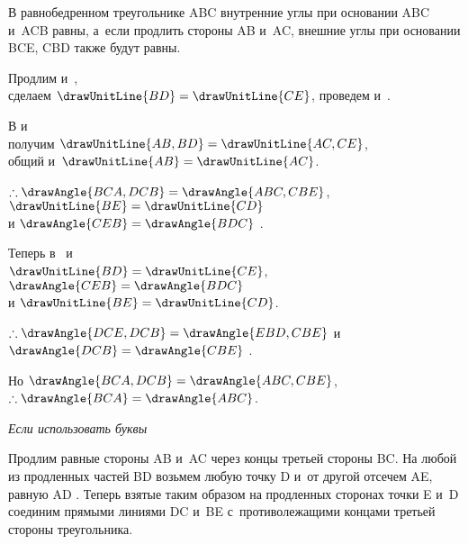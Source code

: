 \documentclass[letters]{byrne-book}
\begin{document}
В равнобедренном треугольнике ABC внутренние углы при основании ABC и~ACB равны, а~если продлить стороны AB и~AC, внешние углы при основании BCE, CBD также будут равны.

\begin{center}
Продлим  и~,\\
сделаем $\drawUnitLine{BD} = \drawUnitLine{CE}$, проведем  и~.

В
и
\\
получим $\drawUnitLine{AB,BD} = \drawUnitLine{AC,CE}$,\\
 общий и~$\drawUnitLine{AB} = \drawUnitLine{AC}$.

$\therefore \drawAngle{BCA,DCB} = \drawAngle{ABC,CBE}$, $\drawUnitLine{BE} = \drawUnitLine{CD}$\\
и $\drawAngle{CEB} = \drawAngle{BDC}$ .

Теперь в~ и~\\
$\drawUnitLine{BD} = \drawUnitLine{CE}$, $\drawAngle{CEB} = \drawAngle{BDC}$\\
и $\drawUnitLine{BE} = \drawUnitLine{CD}$.

$\therefore \drawAngle{DCE,DCB} = \drawAngle{EBD,CBE}$
и $\drawAngle{DCB} = \drawAngle{CBE}$ .

Но $\drawAngle{BCA,DCB} = \drawAngle{ABC,CBE}$, $\therefore \drawAngle{BCA} = \drawAngle{ABC}$.
\end{center}

\qedNB

\begin{center}
\emph{Если использовать буквы}
\end{center}

Продлим равные стороны AB и~AC через концы третьей стороны BC. На любой из продленных частей BD возьмем любую точку D и~от другой отсечем AE, равную AD . Теперь взятые таким образом на продленных сторонах точки E и~D соединим прямыми линиями DC и~BE с~противолежащими концами третьей стороны треугольника.
\end{document}
